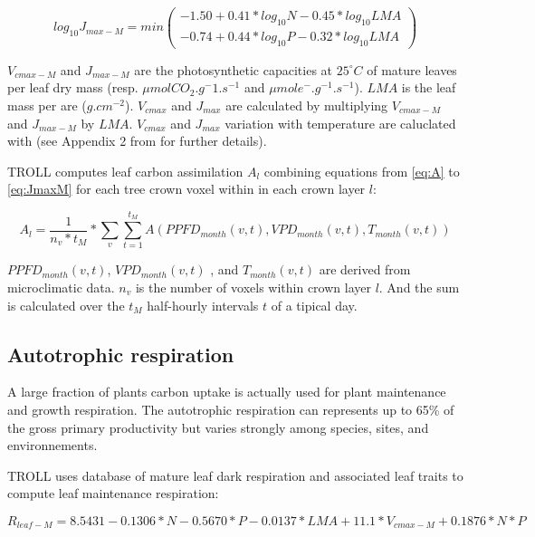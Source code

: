\documentclass[]{article}
\theoremstyle{definition}
\theoremstyle{definition}
\theoremstyle{remark}
\begin{document}
\begin{equation}
  log_{10} J_{max-M} = min(
  \begin{array}{c} 
    -1.50+0.41*log_{10} N-0.45*log_{10} LMA \\
    -0.74+0.44*log_{10} P-0.32*log_{10} LMA 
  \end{array}
  )
  \label{eq:JmaxM}
\end{equation}

\(V_{cmax-M}\) and \(J_{max-M}\) are the photosynthetic capacities at
\(25^\circ C\) of mature leaves per leaf dry mass (resp.
\(\mu mol CO_2.g^-1.s^{-1}\) and \(\mu mol e^-.g^{-1}.s^{-1}\)). \(LMA\)
is the leaf mass per are (\(g.cm^{-2}\)). \(V_{cmax}\) and \(J_{max}\)
are calculated by multiplying \(V_{cmax-M}\) and \(J_{max-M}\) by
\(LMA\). \(V_{cmax}\) and \(J_{max}\) variation with temperature are
caluclated with \citet{Bernacchi2003} (see Appendix 2 from \citet{Li}
for further details).

TROLL computes leaf carbon assimilation \(A_l\) combining equations from
\eqref{eq:A} to \eqref{eq:JmaxM} for each tree crown voxel within in each
crown layer \(l\):

\begin{equation}
  A_l = \frac{1}{n_v*t_M} * \sum_v  \sum^{t_M}_{t=1} A(PPFD_{month}(v,t),VPD_{month}(v,t),T_{month}(v,t))
  \label{eq:Al}
\end{equation}

\(PPFD_{month}(v,t)\), \(VPD_{month}(v,t)\) , and \(T_{month}(v,t)\) are
derived from microclimatic data. \(n_v\) is the number of voxels within
crown layer \(l\). And the sum is calculated over the \(t_M\)
half-hourly intervals \(t\) of a tipical day.

\subsection{Autotrophic respiration}\label{autotrophic-respiration}

A large fraction of plants carbon uptake is actually used for plant
maintenance and growth respiration. The autotrophic respiration can
represents up to 65\% of the gross primary productivity but varies
strongly among species, sites, and environnements.

TROLL uses \citet{Atkin2015} database of mature leaf dark respiration
and associated leaf traits to compute leaf maintenance respiration:

\begin{equation}
  R_{leaf-M} = 8.5431-0.1306*N-0.5670*P-0.0137*LMA+11.1*V_{cmax-M}+0.1876*N*P
  \label{eq:Rl}
\end{equation}
\end{document}
